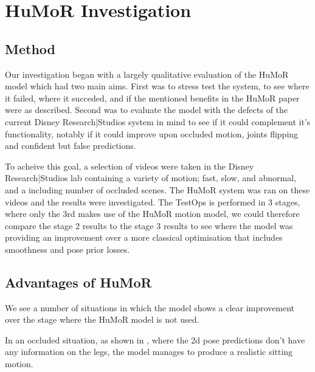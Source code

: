 \section{HuMoR Investigation}
\label{sec:humor_investigation}

\subsection{Method}
Our investigation began with a largely qualitative evaluation of the HuMoR model which had two main aims.  First was to stress test the system, to see where it failed, where it succeded, and if the mentioned benefits in the HuMoR paper \cite{humor} were as described.  Second was to evaluate the model with the defects of the current Disney Research|Studios system in mind to see if it could complement it's functionality, notably if it could improve upon occluded motion, joints flipping and confident but false predictions.

To acheive this goal, a selection of videos were taken in the Disney Research|Studios lab containing a variety of motion; fast, slow, and abnormal, and a including number of occluded scenes.  The HuMoR system was ran on these videos and the results were investigated.  The TestOps is performed in 3 stages, where only the 3rd makes use of the HuMoR motion model, we could therefore compare the stage 2 results to the stage 3 results to see where the model was providing an improvement over a more classical optimisation that includes smoothness and pose prior losses.


\subsection{Advantages of HuMoR}
We see a number of situations in which the model shows a clear improvement over the stage where the HuMoR model is not used.

In an occluded situation, as shown in , where the 2d pose predictions don't have any information on the legs, the model manages to produce a realistic sitting motion.

